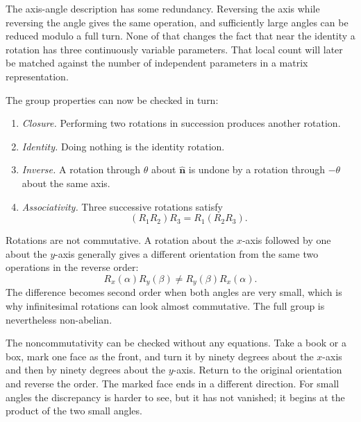 The axis-angle description has some redundancy. Reversing the axis while
reversing the angle gives the same operation, and sufficiently large angles
can be reduced modulo a full turn. None of that changes the fact that near the
identity a rotation has three continuously variable parameters. That local
count will later be matched against the number of independent parameters in a
matrix representation.

The group properties can now be checked in turn:
\begin{enumerate}
\item \emph{Closure.} Performing two rotations in succession produces another
rotation.
\item \emph{Identity.} Doing nothing is the identity rotation.
\item \emph{Inverse.} A rotation through \(\theta\) about
\(\hat{\boldsymbol n}\) is undone by a rotation through \(-\theta\) about the
same axis.
\item \emph{Associativity.} Three successive rotations satisfy
\[
(R_1R_2)R_3=R_1(R_2R_3).
\]
\end{enumerate}

Rotations are not commutative. A rotation about the \(x\)-axis followed by one
about the \(y\)-axis generally gives a different orientation from the same two
operations in the reverse order:
\begin{equation}
R_x(\alpha)R_y(\beta)\ne R_y(\beta)R_x(\alpha).
\end{equation}
The difference becomes second order when both angles are very small, which is
why infinitesimal rotations can look almost commutative. The full group is
nevertheless non-abelian.

The noncommutativity can be checked without any equations. Take a book or a
box, mark one face as the front, and turn it by ninety degrees about the
\(x\)-axis and then by ninety degrees about the \(y\)-axis. Return to the
original orientation and reverse the order. The marked face ends in a
different direction. For small angles the discrepancy is harder to see, but
it has not vanished; it begins at the product of the two small angles.

\begin{classroomqa}
\end{classroomqa}


